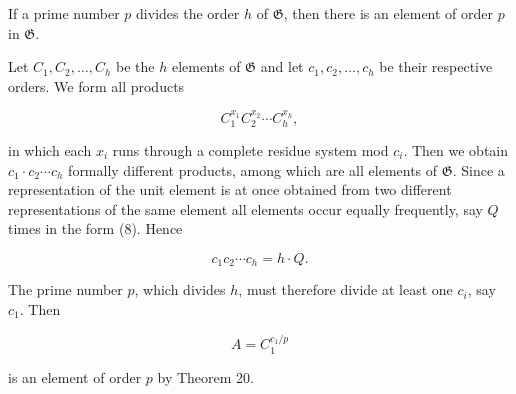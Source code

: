 If a prime number $p$ divides the order $h$ of $\mathfrak{G}$, then there is an element of order $p$ in $\mathfrak{G}$.

Let $C_1, C_2, \ldots, C_h$ be the $h$ elements of $\mathfrak{G}$ and let $c_1, c_2, \ldots, c_h$ be their respective orders. We form all products

$$C_1^{x_1} C_2^{x_2} \cdots C_h^{x_h},$$

in which each $x_i$ runs through a complete residue system mod $c_i$. Then we obtain $c_1 \cdot c_2 \cdots c_h$ formally different products, among which are all elements of $\mathfrak{G}$. Since a representation of the unit element is at once obtained from two different representations of the same element all elements occur equally frequently, say $Q$ times in the form (8). Hence

$$c_1 c_2 \cdots c_h = h \cdot Q.$$

The prime number $p$, which divides $h$, must therefore divide at least one $c_i$, say $c_1$. Then

$$A = C_1^{c_1/p}$$

is an element of order $p$ by Theorem 20.
